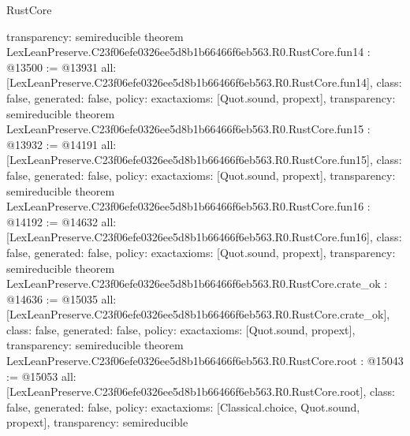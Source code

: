 \begin{lexlean}{RustCore}
\begin{coremodule}
{  transparency: semireducible
}
theorem LexLeanPreserve.C23f06efe0326ee5d8b1b66466f6eb563.R0.RustCore.fun14 : @13500 := @13931 {
  all: [LexLeanPreserve.C23f06efe0326ee5d8b1b66466f6eb563.R0.RustCore.fun14],
  class: false,
  generated: false,
  policy: exact{axioms: [Quot.sound, propext]},
  transparency: semireducible
}
theorem LexLeanPreserve.C23f06efe0326ee5d8b1b66466f6eb563.R0.RustCore.fun15 : @13932 := @14191 {
  all: [LexLeanPreserve.C23f06efe0326ee5d8b1b66466f6eb563.R0.RustCore.fun15],
  class: false,
  generated: false,
  policy: exact{axioms: [Quot.sound, propext]},
  transparency: semireducible
}
theorem LexLeanPreserve.C23f06efe0326ee5d8b1b66466f6eb563.R0.RustCore.fun16 : @14192 := @14632 {
  all: [LexLeanPreserve.C23f06efe0326ee5d8b1b66466f6eb563.R0.RustCore.fun16],
  class: false,
  generated: false,
  policy: exact{axioms: [Quot.sound, propext]},
  transparency: semireducible
}
theorem LexLeanPreserve.C23f06efe0326ee5d8b1b66466f6eb563.R0.RustCore.crate_ok : @14636 := @15035 {
  all: [LexLeanPreserve.C23f06efe0326ee5d8b1b66466f6eb563.R0.RustCore.crate_ok],
  class: false,
  generated: false,
  policy: exact{axioms: [Quot.sound, propext]},
  transparency: semireducible
}
theorem LexLeanPreserve.C23f06efe0326ee5d8b1b66466f6eb563.R0.RustCore.root : @15043 := @15053 {
  all: [LexLeanPreserve.C23f06efe0326ee5d8b1b66466f6eb563.R0.RustCore.root],
  class: false,
  generated: false,
  policy: exact{axioms: [Classical.choice, Quot.sound, propext]},
  transparency: semireducible
}


\end{coremodule}
\end{lexlean}
